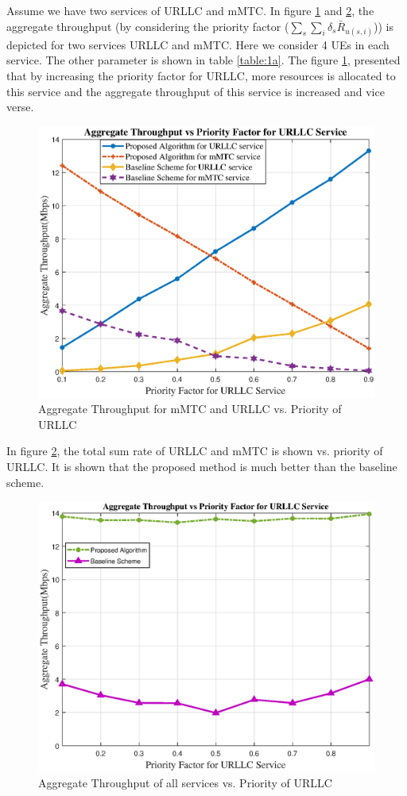 \documentclass[conference]{IEEEtran}
\begin{document}
Assume we have two services of URLLC and mMTC. In figure \ref{fig:2} and \ref{fig:3}, the aggregate throughput (by considering the priority factor 
($\sum_s \sum_i \delta_s \bar{R}_{{u(s,i)}}$)) is depicted for two services URLLC and mMTC. Here we consider 4 UEs in each service. The other parameter is shown in table \ref{table:1a}.
The figure \ref{fig:2}, presented that by increasing the priority factor for URLLC, more resources is allocated to this service and the aggregate throughput of this service is increased and vice verse.
\begin{figure}
  \centering 
    \includegraphics[scale = 0.4]{mmtcurllc.eps}
  \caption{Aggregate Throughput for mMTC and URLLC vs. Priority of URLLC }
  \label{fig:2}
\end{figure}
In figure \ref{fig:3}, the total sum rate of URLLC and mMTC is shown vs. priority of URLLC. It is shown that the proposed method is much better than the baseline scheme. 
\begin{figure}
  \centering 
    \includegraphics[scale = 0.4]{sumRatePri.eps}
  \caption{Aggregate Throughput of all services vs. Priority of URLLC}
  \label{fig:3}
\end{figure}
\end{document}
